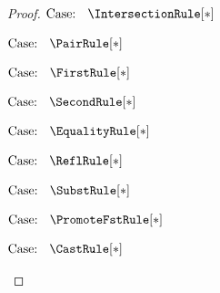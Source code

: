 \begin{proof}
    $\text{Case: }\begin{array}{c} \IntersectionRule[*] \end{array}$
    \begin{proofcase}
    \end{proofcase}

    $\text{Case: }\begin{array}{c} \PairRule[*] \end{array}$
    \begin{proofcase}
    \end{proofcase}

    $\text{Case: }\begin{array}{c} \FirstRule[*] \end{array}$
    \begin{proofcase}
    \end{proofcase}

    $\text{Case: }\begin{array}{c} \SecondRule[*] \end{array}$
    \begin{proofcase}
    \end{proofcase}

    $\text{Case: }\begin{array}{c} \EqualityRule[*] \end{array}$
    \begin{proofcase}
    \end{proofcase}

    $\text{Case: }\begin{array}{c} \ReflRule[*] \end{array}$
    \begin{proofcase}
    \end{proofcase}

    $\text{Case: }\begin{array}{c} \SubstRule[*] \end{array}$
    \begin{proofcase}
    \end{proofcase}

    $\text{Case: }\begin{array}{c} \PromoteFstRule[*] \end{array}$
    \begin{proofcase}
    \end{proofcase}

    $\text{Case: }\begin{array}{c} \CastRule[*] \end{array}$
    \begin{proofcase}
    \end{proofcase}


\end{proof}
